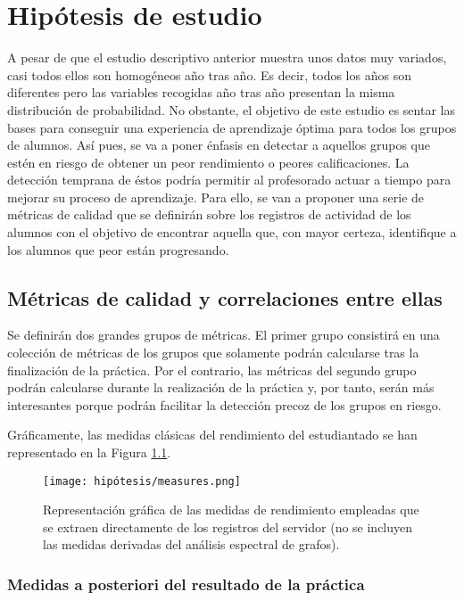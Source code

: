 \chapter{Hipótesis de estudio}\label{sec:chapterVII}

A pesar de que el estudio descriptivo anterior muestra unos datos muy variados, casi todos ellos son homogéneos año tras año. Es decir, todos los años son diferentes pero las variables recogidas año tras año presentan la misma distribución de probabilidad. No obstante, el objetivo de este estudio es sentar las bases para conseguir una experiencia de aprendizaje óptima para todos los grupos de alumnos. Así pues, se va a poner énfasis en detectar a aquellos grupos que estén en riesgo de obtener un peor rendimiento o peores calificaciones. La detección temprana de éstos podría permitir al profesorado actuar a tiempo para mejorar su proceso de aprendizaje. Para ello, se van a proponer una serie de métricas de calidad que se definirán sobre los registros de actividad de los alumnos con el objetivo de encontrar aquella que, con mayor certeza, identifique a los alumnos que peor están progresando.

\section{Métricas de calidad y correlaciones entre ellas}

Se definirán dos grandes grupos de métricas. El primer grupo consistirá en una colección de métricas de los grupos que solamente podrán calcularse tras la finalización de la práctica. Por el contrario, las métricas del segundo grupo podrán calcularse durante la realización de la práctica y, por tanto, serán más interesantes porque podrán facilitar la detección precoz de los grupos en riesgo.

Gráficamente, las medidas clásicas del rendimiento del estudiantado se han representado en la Figura \ref{fig:measures}.

\begin{figure}[H]
    \centering
    \texttt{[image: hipótesis/measures.png]}
    \caption{Representación gráfica de las medidas de rendimiento empleadas que se extraen directamente de los registros del servidor (no se incluyen las medidas derivadas del análisis espectral de grafos).}
    \label{fig:measures}
\end{figure}

\subsection{Medidas a posteriori del resultado de la práctica}

